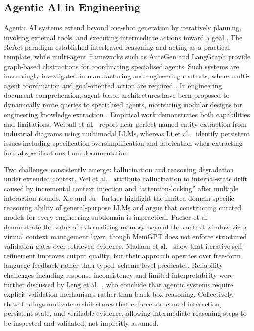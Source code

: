 \documentclass[largeformat]{interact}
\begin{document}
\subsection{Agentic AI in Engineering} 
\label{sec:agentic-ai-engineering} 
Agentic AI systems extend beyond one-shot generation by iteratively planning, invoking external tools, and executing intermediate actions toward a goal \cite{wang2024autonomousagents, prasad2024adapt}. The ReAct paradigm \cite{yao2023reactsynergizingreasoningacting} established interleaved reasoning and acting as a practical template, while multi-agent frameworks such as AutoGen \cite{wu2024autogen} and LangGraph provide graph-based abstractions for coordinating specialised agents. Such systems are increasingly investigated in manufacturing and engineering contexts, where multi-agent coordination and goal-oriented action are required \cite{leng2026, zhao2025}. In engineering document comprehension, agent-based architectures have been proposed to dynamically route queries to specialised agents, motivating modular designs for engineering knowledge extraction \cite{xie2026agentframework}. Empirical work demonstrates both capabilities and limitations: Weibull et al.~\cite{weibull_named_2025} report near-perfect named entity extraction from industrial diagrams using multimodal LLMs, whereas Li et al.~\cite{li2025a} identify persistent issues including specification oversimplification and fabrication when extracting formal specifications from documentation.
 
Two challenges consistently emerge: hallucination and reasoning degradation under extended context. Wei et al.~\cite{wei2026shadows} attribute hallucination to internal-state drift caused by incremental context injection and ``attention-locking'' after multiple interaction rounds. Xie and Ju~\cite{xie2026agentframework} further highlight the limited domain-specific reasoning ability of general-purpose LLMs and argue that constructing curated models for every engineering subdomain is impractical. Packer et al.~\cite{packer2023memgpt} demonstrate the value of externalising memory beyond the context window via a virtual context management layer, though MemGPT does not enforce structured validation gates over retrieved evidence. Madaan et al.~\cite{madaan2023selfrefine} show that iterative self-refinement improves output quality, but their approach operates over free-form language feedback rather than typed, schema-level predicates. Reliability challenges including response inconsistency and limited interpretability were further discussed by Leng et al.~\cite{leng2026}, who conclude that agentic systems require explicit validation mechanisms rather than black-box reasoning. Collectively, these findings motivate architectures that enforce structured interaction, persistent state, and verifiable evidence, allowing intermediate reasoning steps to be inspected and validated, not implicitly assumed.
\end{document}
